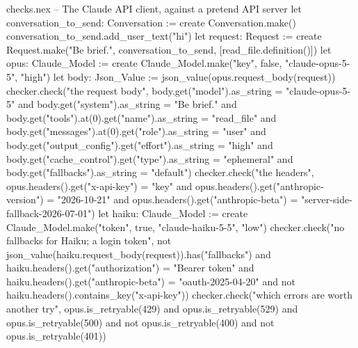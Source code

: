 \begin{continued}{checks.nex}
-- The Claude API client, against a pretend API server
let conversation_to_send: Conversation := create Conversation.make()
conversation_to_send.add_user_text("hi")
let request: Request := create Request.make("Be brief.", conversation_to_send, [read_file.definition()])
let opus: Claude_Model := create Claude_Model.make("key", false, "claude-opus-5-5", "high")
let body: Json_Value := json_value(opus.request_body(request))
checker.check("the request body", body.get("model").as_string = "claude-opus-5-5"
  and body.get("system").as_string = "Be brief." and body.get("tools").at(0).get("name").as_string = "read_file"
  and body.get("messages").at(0).get("role").as_string = "user"
  and body.get("output_config").get("effort").as_string = "high"
  and body.get("cache_control").get("type").as_string = "ephemeral"
  and body.get("fallbacks").as_string = "default")
checker.check("the headers", opus.headers().get("x-api-key") = "key"
  and opus.headers().get("anthropic-version") = "2026-10-21"
  and opus.headers().get("anthropic-beta") = "server-side-fallback-2026-07-01")
let haiku: Claude_Model := create Claude_Model.make("token", true, "claude-haiku-5-5", "low")
checker.check("no fallbacks for Haiku; a login token", not json_value(haiku.request_body(request)).has("fallbacks")
  and haiku.headers().get("authorization") = "Bearer token"
  and haiku.headers().get("anthropic-beta") = "oauth-2025-04-20" and not haiku.headers().contains_key("x-api-key"))
checker.check("which errors are worth another try", opus.is_retryable(429) and opus.is_retryable(529)
  and opus.is_retryable(500) and not opus.is_retryable(400) and not opus.is_retryable(401))


\end{continued}
